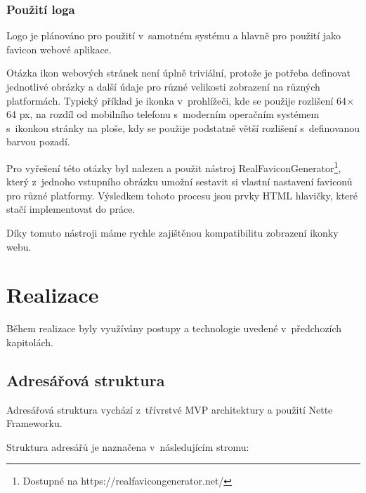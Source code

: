 \documentclass[czech,BP]{thesiskiv}
\begin{document}
	\subsection{Použití loga}
	\par Logo je plánováno pro použití v~samotném systému a hlavně pro použití jako favicon webové aplikace.
	\par Otázka ikon webových stránek není úplně triviální, protože je potřeba definovat jednotlivé obrázky a další údaje pro různé velikosti zobrazení na různých platformách. Typický příklad je ikonka v~prohlížeči, kde se použije rozlišení 64$\times$64 px, na rozdíl od mobilního telefonu s~moderním operačním systémem s~ikonkou stránky na ploše, kdy se použije podstatně větší rozlišení s~definovanou barvou pozadí.
	\par Pro vyřešení této otázky byl nalezen a použit nástroj RealFaviconGenerator\footnote{Dostupné na https://realfavicongenerator.net/}, který z~jednoho vstupního obrázku umožní sestavit si vlastní nastavení faviconů pro různé platformy. Výsledkem tohoto procesu jsou prvky HTML hlavičky, které stačí implementovat do práce. 
	\par Díky tomuto nástroji máme rychle zajištěnou kompatibilitu zobrazení ikonky webu.
\chapter{Realizace}
	\par Během realizace byly využívány postupy a technologie uvedené v~předchozích kapitolách.
	\section{Adresářová struktura}
	\par Adresářová struktura vychází z~třívrstvé MVP architektury a  použití Nette Frameworku.
	\par Struktura adresářů je naznačena v~následujícím stromu:
\end{document}
